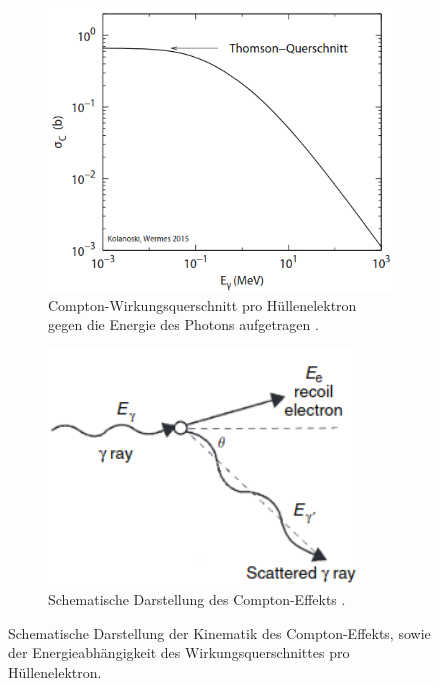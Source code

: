 \begin{figure}
\centering
\begin{subfigure}{0.55\textwidth}
\centering
\includegraphics[width=1.03\textwidth]{compton2.png}
\captionsetup{format=hang, labelfont = bf, textfont = small}
\caption{Compton-Wirkungsquerschnitt pro Hüllenelektron gegen die Energie des Photons aufgetragen \cite{quelle03}.}
\label{fig:tfig3}
\end{subfigure}
\begin{subfigure}{0.42\textwidth}
\vspace{35pt}
\centering
\includegraphics[width=0.9\textwidth]{Compton.png}
\vspace{39pt}
\captionsetup{format=hang, labelfont = bf, textfont = small}
\caption{Schematische Darstellung des Compton-Effekts \cite{quelle02}.}
\label{fig:tfig4}
\end{subfigure}
\caption{Schematische Darstellung der Kinematik des Compton-Effekts, sowie der Energieabhängigkeit des Wirkungsquerschnittes pro Hüllenelektron.}
\vspace{15pt}
\label{fig:tfig34}
\end{figure}
